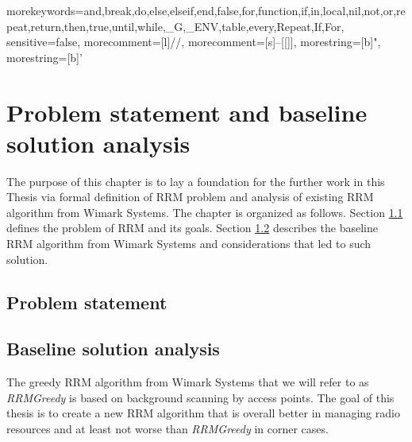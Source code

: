 

{
morekeywords={and,break,do,else,elseif,end,false,for,function,if,in,local,nil,not,or,repeat,return,then,true,until,while,_G,_ENV,table,every,Repeat,If,For},
sensitive=false,
morecomment=[l]{//},
morecomment=[s]{--[[}{]]},
morestring=[b]",
morestring=[b]'
}

\lstset{style=mystyle}


\chapter{Problem statement and baseline solution analysis}
\label{chap:met}


The purpose of this chapter is to lay a foundation for the further work in this Thesis via formal definition of RRM problem and analysis of existing RRM algorithm from Wimark Systems. The chapter is organized as follows. Section \ref{sec:prob} defines the problem of RRM and its goals. Section \ref{sec:baseline} describes the baseline RRM algorithm from Wimark Systems and considerations that led to such solution.


\section{Problem statement}
\label{sec:prob}


\section{Baseline solution analysis}
\label{sec:baseline}
The greedy RRM algorithm from Wimark Systems that we will refer to as \textit{RRMGreedy} is based on background scanning by access points. The goal of this thesis is to create a new RRM algorithm that is overall better in managing radio resources and at least not worse than \textit{RRMGreedy} in corner cases.

